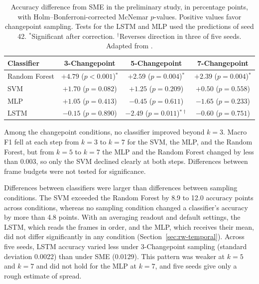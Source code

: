 \begin{table}[t]
   \centering
   \caption[Accuracy difference from SME in the preliminary study]{Accuracy difference from SME in the preliminary study, in percentage points, with Holm--Bonferroni-corrected McNemar $p$-values. Positive values favor changepoint sampling. Tests for the LSTM and MLP used the predictions of seed 42. $^{*}$Significant after correction. $^{\dagger}$Reverses direction in three of five seeds. Adapted from .}
   \label{tab:prelim-mcnemar}
   \small
   \begin{tabular}{lccc}
      \toprule
      Classifier & 3-Changepoint & 5-Changepoint & 7-Changepoint \\
      \midrule
      Random Forest & $+4.79$ ($p < 0.001$)$^{*}$ & $+2.59$ ($p = 0.004$)$^{*}$ & $+2.39$ ($p = 0.004$)$^{*}$ \\
      SVM & $+1.70$ ($p = 0.082$) & $+1.25$ ($p = 0.209$) & $+0.50$ ($p = 0.558$) \\
      MLP & $+1.05$ ($p = 0.413$) & $-0.45$ ($p = 0.611$) & $-1.65$ ($p = 0.233$) \\
      LSTM & $-0.15$ ($p = 0.890$) & $-2.49$ ($p = 0.011$)$^{*\dagger}$ & $-0.60$ ($p = 0.751$) \\
      \bottomrule
   \end{tabular}
\end{table}

Among the changepoint conditions, no classifier improved beyond $k = 3$. Macro F1 fell at each step from $k = 3$ to $k = 7$ for the SVM, the MLP, and the Random Forest, but from $k = 5$ to $k = 7$ the MLP and the Random Forest changed by less than 0.003, so only the SVM declined clearly at both steps. Differences between frame budgets were not tested for significance.

Differences between classifiers were larger than differences between sampling conditions. The SVM exceeded the Random Forest by 8.9 to 12.0 accuracy points across conditions, whereas no sampling condition changed a classifier's accuracy by more than 4.8 points. With an averaging readout and default settings, the LSTM, which reads the frames in order, and the MLP, which receives their mean, did not differ significantly in any condition (Section~\ref{sec:rw-temporal}). Across five seeds, LSTM accuracy varied less under 3-Changepoint sampling (standard deviation 0.0022) than under SME (0.0129). This pattern was weaker at $k = 5$ and $k = 7$ and did not hold for the MLP at $k = 7$, and five seeds give only a rough estimate of spread.

